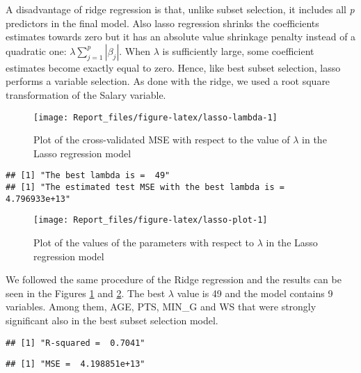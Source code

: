 \documentclass[
]{article}
\begin{document}
A disadvantage of ridge regression is that, unlike subset selection, it
includes all \emph{p} predictors in the final model. Also lasso
regression shrinks the coefficients estimates towards zero but it has an
absolute value shrinkage penalty instead of a quadratic one:
\(\lambda \sum^p_{j=1} |\beta_j|\). When \(\lambda\) is sufficiently
large, some coefficient estimates become exactly equal to zero. Hence,
like best subset selection, lasso performs a variable selection. As done
with the ridge, we used a root square transformation of the Salary
variable.

\begin{figure}

{\centering \texttt{[image: Report\_files/figure-latex/lasso-lambda-1]} 

}

\caption{Plot of the cross-validated MSE with respect to the value of $\lambda$ in the Lasso regression model \label{fig:lasso-lambda}}\label{fig:lasso-lambda}
\end{figure}

\begin{verbatim}
## [1] "The best lambda is =  49"
## [1] "The estimated test MSE with the best lambda is =  4.796933e+13"
\end{verbatim}

\begin{figure}

{\centering \texttt{[image: Report\_files/figure-latex/lasso-plot-1]} 

}

\caption{Plot of the values of the parameters with respect to $\lambda$ in the Lasso regression model \label{fig:lasso-plot}}\label{fig:lasso-plot}
\end{figure}

We followed the same procedure of the Ridge regression and the results
can be seen in the Figures \ref{fig:lasso-lambda} and
\ref{fig:lasso-plot}. The best \(\lambda\) value is 49 and the model
contains 9 variables. Among them, AGE, PTS, MIN\_G and WS that were
strongly significant also in the best subset selection model.

\begin{verbatim}
## [1] "R-squared =  0.7041"
\end{verbatim}

\begin{verbatim}
## [1] "MSE =  4.198851e+13"
\end{verbatim}
\end{document}
